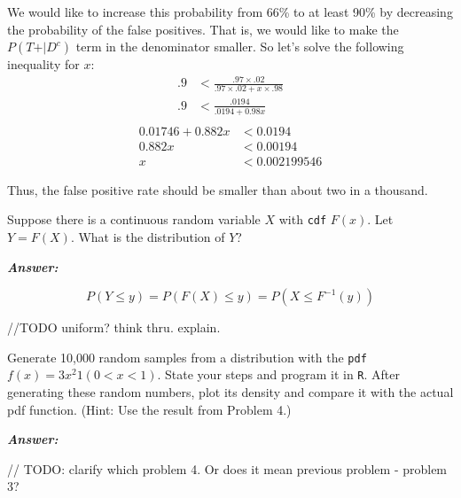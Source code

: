 \documentclass[12pt]{article}
\newenvironment{question}[2][Question]{\begin{trivlist}
\item[\hskip \labelsep {\bfseries #1}\hskip \labelsep {\bfseries #2.}]}{\end{trivlist}}
\begin{document}
 We would like to increase this probability from 66\% to at least 90\% by decreasing the probability of the false positives. That is, we would like to make the $P(T\text{+} | D^c)$ term in the denominator smaller. So let's solve the following inequality for $x$:
 \begin{align*}
 .9 &< \frac{.97 \times .02}{.97 \times .02 + x\times .98}\\
 .9 &< \frac{.0194} { .0194 +  0.98x}\\
\end{align*}
 \begin{align*} 
 0.01746 + 0.882 x &<  0.0194 \\
0.882 x &< 0.00194 \\
x &< 0.002199546
\end{align*}

Thus, the false positive rate should be smaller than about two in a thousand.


\bigskip
\bigskip
\begin{question}{2.3} Suppose there is a continuous random variable $X$ with \texttt{cdf} $F(x) $. Let $ Y = F(X) $. What is the distribution of $Y$? 
\end{question}

 \textbf{\emph{Answer:} } 

$$
P ( Y \leq y ) = P( F(X) \leq y) = P( X \leq F^{-1}(y) )
$$

//TODO uniform? think thru. explain.
\bigskip
\bigskip
\begin{question}{2.4} 
Generate 10,000 random samples from a distribution with the \texttt{pdf} $f(x) = 3 x^2 1(0 < x < 1) $. State your steps and program it in \texttt{R}. After generating these random numbers, plot its density and compare it with the actual pdf function. (Hint: Use the result from Problem 4.)

\end{question}


 \textbf{\emph{Answer:} } 
 
 // TODO: clarify which problem 4. Or does it mean previous problem - problem 3?
\end{document}
